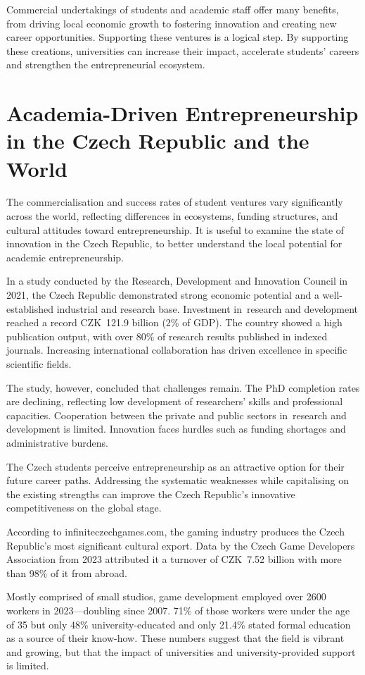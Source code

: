 Commercial undertakings of students and academic staff offer many benefits, from driving local economic growth to fostering innovation and creating new career opportunities. Supporting these ventures is a logical step. By supporting these creations, universities can increase their impact, accelerate students' careers and strengthen the entrepreneurial ecosystem.

\section{Academia-Driven Entrepreneurship in the Czech Republic and the World}
The commercialisation and success rates of student ventures vary significantly across the world, reflecting differences in ecosystems, funding structures, and cultural attitudes toward entrepreneurship. It is useful to examine the state of innovation in the Czech Republic, to better understand the local potential for academic entrepreneurship.

In a study conducted by the Research, Development and Innovation Council in 2021, the Czech Republic demonstrated strong economic potential and a well-established industrial and research base. Investment in~research and development reached a record CZK~121.9 billion (2\% of GDP). The country showed a high publication output, with over 80\% of research results published in indexed journals. Increasing international collaboration has driven excellence in specific scientific fields.\cite{kauffman_tech-transfer}

The study, however, concluded that challenges remain. The PhD completion rates are declining, reflecting low development of researchers' skills and professional capacities. Cooperation between the private and public sectors in~research and development is limited. Innovation faces hurdles such as funding shortages and administrative burdens.

The Czech students perceive entrepreneurship as an attractive option for their future career paths. Addressing the systematic weaknesses while capitalising on the existing strengths can improve the Czech Republic’s innovative competitiveness on the global stage.\cite{Antlova_entrepreneurship-cz}

According to infiniteczechgames.com, the gaming industry produces the Czech Republic’s most significant cultural export. Data by the Czech Game Developers Association from 2023 attributed it a turnover of CZK~7.52 billion with more than 98\% of it from abroad.\cite{Žák-gaming, Czech-Developers_INDUSTRY}

Mostly comprised of small studios, game development employed over 2600 workers in 2023---doubling since 2007. 71\% of those workers were under the age of 35 but only 48\% university-educated and only 21.4\% stated formal education as a source of their know-how. These numbers suggest that the field is vibrant and growing, but that the impact of universities and university-provided support is limited.\cite{Žák-gaming, Czech-Developers_INDUSTRY}
